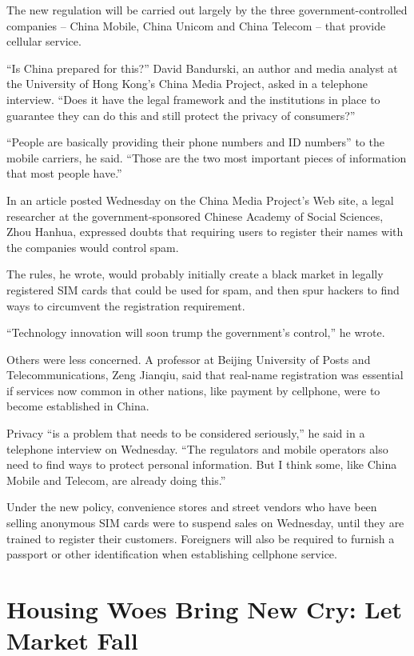 ﻿\documentclass[12pt]{article}
\begin{document}
The new regulation will be carried out largely by the three government-controlled companies -- China
Mobile, China Unicom and China Telecom -- that provide cellular service.

``Is China prepared for this?'' David Bandurski, an author and media analyst at the University of
Hong Kong's China Media Project, asked in a telephone interview. ``Does it have the legal framework
and the institutions in place to guarantee they can do this and still protect the privacy of
consumers?''

``People are basically providing their phone numbers and ID numbers'' to the mobile carriers, he
said. ``Those are the two most important pieces of information that most people have.''

In an article posted Wednesday on the China Media Project's Web site, a legal researcher at the
government-sponsored Chinese Academy of Social Sciences, Zhou Hanhua, expressed doubts that
requiring users to register their names with the companies would control spam.

The rules, he wrote, would probably initially create a black market in legally registered SIM cards
that could be used for spam, and then spur hackers to find ways to circumvent the registration
requirement.

``Technology innovation will soon trump the government's control,'' he wrote.

Others were less concerned. A professor at Beijing University of Posts and Telecommunications, Zeng
Jianqiu, said that real-name registration was essential if services now common in other nations,
like payment by cellphone, were to become established in China.

Privacy ``is a problem that needs to be considered seriously,'' he said in a telephone interview on
Wednesday. ``The regulators and mobile operators also need to find ways to protect personal
information. But I think some, like China Mobile and Telecom, are already doing this.''

Under the new policy, convenience stores and street vendors who have been selling anonymous SIM
cards were to suspend sales on Wednesday, until they are trained to register their customers.
Foreigners will also be required to furnish a passport or other identification when establishing
cellphone service.

\pagebreak
\section{Housing Woes Bring New Cry: Let Market Fall}
\end{document}
